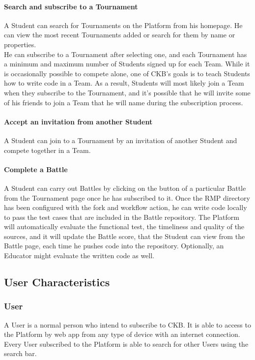 \paragraph{Search and subscribe to a Tournament}
A Student can search for Tournaments on the Platform from his homepage. He can view the most recent Tournaments added or search for them by name or properties.\\
He can subscribe to a Tournament after selecting one, and each Tournament has a minimum and maximum number of Students signed up for each Team. While it is occasionally possible to compete alone, one of CKB's goals is to teach 
Students how to write code in a Team. As a result, Students will most likely join a Team when they subscribe to the Tournament, and it's possible that he will invite some of his friends to join a Team that he will name during the 
subscription process.
\paragraph{Accept an invitation from another Student}
A Student can join to a Tournament by an invitation of another Student and compete together in a Team.
\paragraph{Complete a Battle}
A Student can carry out Battles by clicking on the button of a particular Battle from the Tournament page once he has subscribed to it. Once the RMP directory has been configured with the fork and workflow action, he can write code 
locally to pass the test cases that are included in the Battle repository. The Platform will automatically evaluate the functional test, the timeliness and quality of the sources, and it will update the Battle score, that the Student 
can view from the Battle page, each time he pushes code into the repository. Optionally, an Educator might evaluate the written code as well.

\subsection{User Characteristics}
\subsubsection{User}
A User is a normal person who intend to subscribe to CKB. It is able to access to the Platform by web app from any type of device with an internet connection.\\
Every User subscribed to the Platform is able to search for other Users using the search bar.

